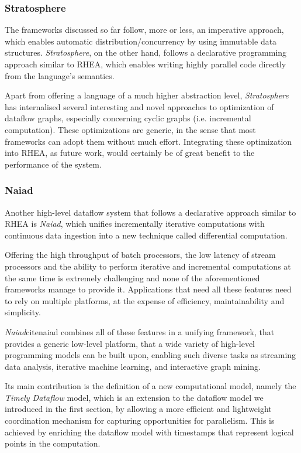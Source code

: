 \documentclass[sigplan,review,anonymous]{acmart}
\begin{document}
\subsubsection{Stratosphere}

The frameworks discussed so far follow, more or less, an imperative approach,
which enables automatic distribution/concurrency by using immutable data
structures. \textit{Stratosphere}\cite{stratosphere}, on the other hand, follows
a declarative programming approach similar to \textsc{RHEA}, which enables
writing highly parallel code directly from the language's semantics.

Apart from offering a language of a much higher abstraction level,
\textit{Stratosphere} has internalised several interesting and novel approaches
to optimization of dataflow graphs, especially concerning cyclic graphs (i.e.
incremental computation)\cite{spinning}. These optimizations are generic, in the
sense that most frameworks can adopt them without much effort. Integrating these
optimization into \textsc{RHEA}, as future work, would certainly be of great
benefit to the performance of the system.

\subsubsection{Naiad}

Another high-level dataflow system that follows a declarative approach similar
to \textsc{RHEA} is \textit{Naiad}, which unifies incrementally iterative
computations with continuous data ingestion into a new technique called
differential computation.

Offering the high throughput of batch processors, the low latency of stream
processors and the ability to perform iterative and incremental computations at
the same time is extremely challenging and none of the aforementioned frameworks
manage to provide it. Applications that need all these features need to rely on
multiple platforms, at the expense of efficiency, maintainability and
simplicity.

\textit{Naiad}cite{naiad} combines all of these features in a unifying
framework, that provides a generic low-level platform, that a wide variety of
high-level programming models can be built upon, enabling such diverse tasks as
streaming data analysis, iterative machine learning, and interactive graph
mining.

Its main contribution is the definition of a new computational model, namely the
\textit{Timely Dataflow} model, which is an extension to the dataflow model we
introduced in the first section, by allowing a more efficient and lightweight
coordination mechanism for capturing opportunities for parallelism. This is
achieved by enriching the dataflow model with timestamps that represent logical
points in the computation.
\end{document}
